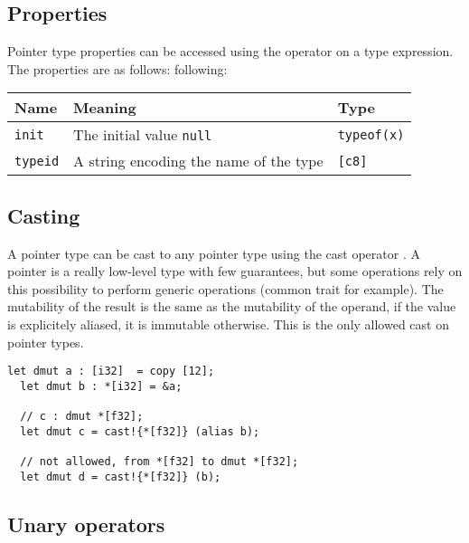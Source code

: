 \subsection {Properties}

Pointer type properties can be accessed using the \token{::} operator on a type
expression. The properties are as follows: following:

\begin{center}\begin{adjustbox}{max width=\linewidth}
  \begin{tabular}{|l|ll|}
    \hline
    Name & Meaning & Type\\
    \hline
    \hline
    \texttt{init} & The initial value \texttt{null} & \texttt{typeof(x)}\\
    \hline
    \texttt{typeid} & A string encoding the name of the type & \texttt{[c8]} \\
    \hline
  \end{tabular}
\end{adjustbox}\end{center}

\subsection {Casting}

A pointer type can be cast to any pointer type using the cast operator
. A pointer is a really low-level type with few guarantees,
but some operations rely on this possibility to perform generic operations
(common trait  for example). The mutability of the result is
the same as the mutability of the operand, if the value is explicitely aliased,
it is immutable otherwise. This is the only allowed cast on pointer types.
\smallskip

\begin{lstlisting}[style=coloredverbatim]
  let dmut a : [i32]  = copy [12];
  let dmut b : *[i32] = &a;

  // c : dmut *[f32];
  let dmut c = cast!{*[f32]} (alias b);

  // not allowed, from *[f32] to dmut *[f32];
  let dmut d = cast!{*[f32]} (b);
\end{lstlisting}

\subsection {Unary operators}

